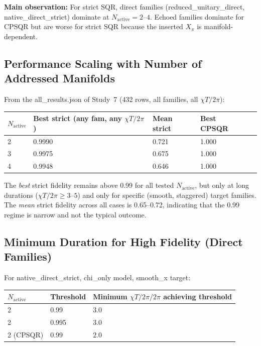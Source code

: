 \documentclass[11pt,letterpaper]{article}
\newcommand{\chiT}{\chi T / 2\pi}
\newcommand{\nact}{N_{\text{active}}}
\begin{document}
\textbf{Main observation:}  For strict SQR, direct families (reduced\_unitary\_direct,
native\_direct\_strict) dominate at $\nact = 2$--$4$.
Echoed families dominate for CPSQR but are worse for strict SQR because
the inserted $X_\pi$ is manifold-dependent.

\subsection{Performance Scaling with Number of Addressed Manifolds}

From the all\_results.json of Study~7 (432 rows, all families, all $\chiT$):

\begin{center}
\begin{tabular}{lllll}
\toprule
$\nact$ & Best strict (any fam, any $\chiT$) & Mean strict & Best CPSQR \\
\midrule
2 & 0.9990 & 0.721 & 1.000 \\
3 & 0.9975 & 0.675 & 1.000 \\
4 & 0.9948 & 0.646 & 1.000 \\
\bottomrule
\end{tabular}
\end{center}

The \emph{best} strict fidelity remains above 0.99 for all tested $\nact$,
but only at long durations ($\chiT \ge 3$--$5$) and only for specific
(smooth, staggered) target families.
The \emph{mean} strict fidelity across all cases is 0.65--0.72,
indicating that the 0.99 regime is narrow and not the typical outcome.

\subsection{Minimum Duration for High Fidelity (Direct Families)}

For native\_direct\_strict, chi\_only model, smooth\_x target:

\begin{center}
\begin{tabular}{lll}
\toprule
$\nact$ & Threshold & Minimum $\chiT / 2\pi$ achieving threshold \\
\midrule
2 & 0.99 & 3.0 \\
2 & 0.995 & 3.0 \\
2 (CPSQR) & 0.99 & 2.0 \\
\bottomrule
\end{tabular}
\end{center}
\end{document}
